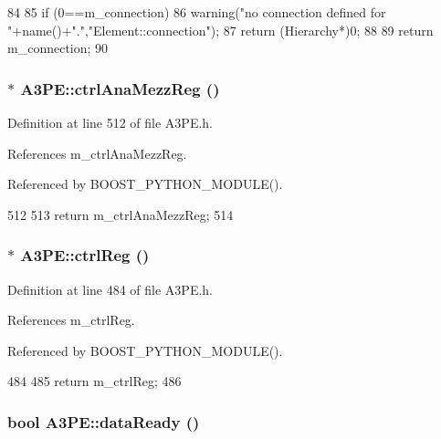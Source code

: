 \begin{DoxyCode}
84                               {
85   if (0==m_connection){
86     warning("no connection defined for "+name()+".","Element::connection");
87     return (Hierarchy*)0;
88   }
89   return m_connection;
90 }
\end{DoxyCode}
\hypertarget{classA3PE_aa94c6120a73194d69dc5761cf90a4800}{
\subsubsection[{ctrlAnaMezzReg}]{$\ast$ A3PE::ctrlAnaMezzReg ()}}
\label{classA3PE_aa94c6120a73194d69dc5761cf90a4800}


Definition at line 512 of file A3PE.h.

References m\_\-ctrlAnaMezzReg.

Referenced by BOOST\_\-PYTHON\_\-MODULE().


\begin{DoxyCode}
512                             {
513     return m_ctrlAnaMezzReg;
514   }
\end{DoxyCode}
\hypertarget{classA3PE_ae5fc5dac92af2b34a41be388586647be}{
\subsubsection[{ctrlReg}]{$\ast$ A3PE::ctrlReg ()}}
\label{classA3PE_ae5fc5dac92af2b34a41be388586647be}


Definition at line 484 of file A3PE.h.

References m\_\-ctrlReg.

Referenced by BOOST\_\-PYTHON\_\-MODULE().


\begin{DoxyCode}
484                      {
485     return m_ctrlReg;
486   }
\end{DoxyCode}
\hypertarget{classA3PE_a55df064c578bbc1e80a3b5fc05933f27}{
\subsubsection[{dataReady}]{\setlength{\rightskip}{0pt plus 5cm}bool A3PE::dataReady ()}}
\label{classA3PE_a55df064c578bbc1e80a3b5fc05933f27}


